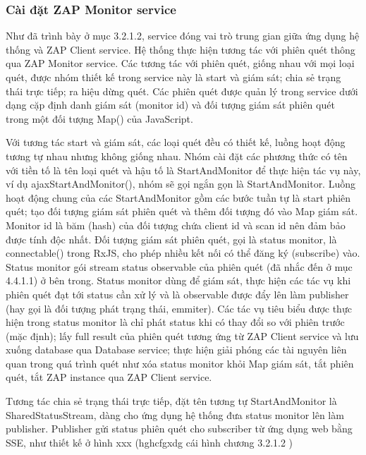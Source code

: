 \subsubsection{Cài đặt ZAP Monitor service}

\tab Như đã trình bày ở mục 3.2.1.2, service đóng vai trò trung gian giữa ứng dụng hệ thống và ZAP Client service. Hệ thống thực hiện tương tác với phiên quét thông qua ZAP Monitor service. Các tương tác với phiên quét, giống nhau với mọi loại quét, được nhóm thiết kế trong service này là start và giám sát; chia sẻ trạng thái trực tiếp; ra hiệu dừng quét. Các phiên quét được quản lý trong service dưới dạng cặp định danh giám sát (monitor id) và đối tượng giám sát phiên quét trong một đối tượng Map() của JavaScript.
\par

Với tương tác start và giám sát, các loại quét đều có thiết kế, luồng hoạt động tương tự nhau nhưng không giống nhau. Nhóm cài đặt các phương thức có tên với tiền tố là tên loại quét và hậu tố là StartAndMonitor để thực hiện tác vụ này, ví dụ ajaxStartAndMonitor(), nhóm sẽ gọi ngắn gọn là StartAndMonitor. Luồng hoạt động chung của các StartAndMonitor gồm các bước tuần tự là start phiên quét; tạo đối tượng giám sát phiên quét và thêm đối tượng đó vào Map giám sát. Monitor id là băm (hash) của đối tượng chứa client id và scan id nên đảm bảo được tính độc nhất. Đối tượng giám sát phiên quét, gọi là status monitor, là connectable() trong RxJS, cho phép nhiều kết nối có thể đăng ký (subscribe) vào. Status monitor gói stream status observable của phiên quét (đã nhắc đến ở mục 4.4.1.1) ở bên trong. Status monitor dùng để giám sát, thực hiện các tác vụ khi phiên quét đạt tới status cần xử lý và là observable được đẩy lên làm publisher (hay gọi là đối tượng phát trạng thái, emmiter). Các tác vụ tiêu biểu được thực hiện trong status monitor là chỉ phát status khi có thay đổi so với phiên trước (mặc định); lấy full result của phiên quét tương ứng từ ZAP Client service và lưu xuống database qua Database service; thực hiện giải phóng các tài nguyên liên quan trong quá trình quét như xóa status monitor khỏi Map giám sát, tắt phiên quét, tắt ZAP instance qua ZAP Client service. 
\par

Tương tác chia sẻ trạng thái trực tiếp, đặt tên tương tự StartAndMonitor là SharedStatusStream, dàng cho ứng dụng hệ thống đưa status monitor lên làm publisher. Publisher gửi status phiên quét cho subscriber từ ứng dụng web bằng SSE, như thiết kế ở hình xxx (hghcfgxdg cái hình chương 3.2.1.2 )
\par

